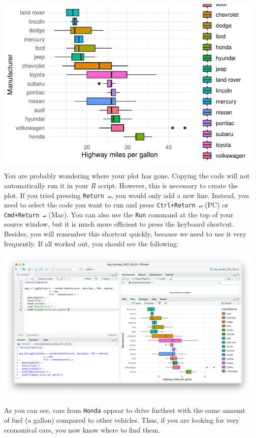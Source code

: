 \documentclass[
  letterpaper,
]{krantz}
\begin{document}
\includegraphics{06_starting_r_projects_files/figure-pdf/r-script-copy-paste-examples-1.pdf}

You are probably wondering where your plot has gone. Copying the code
will not automatically run it in your \emph{R} script. However, this is
necessary to create the plot. If you tried pressing \texttt{Return\ ↵},
you would only add a new line. Instead, you need to select the code you
want to run and press \texttt{Ctrl+Return\ ↵} (PC) or
\texttt{Cmd+Return\ ↵} (Mac). You can also use the \texttt{Run} command
at the top of your source window, but it is much more efficient to press
the keyboard shortcut. Besides, you will remember this shortcut quickly,
because we need to use it very frequently. If all worked out, you should
see the following:

\includegraphics{images/chapter_06_img/02_r_script/01_r_script_example_plot.png}

As you can see, cars from \texttt{Honda} appear to drive furthest with
the same amount of fuel (a gallon) compared to other vehicles. Thus, if
you are looking for very economical cars, you now know where to find
them.
\end{document}
